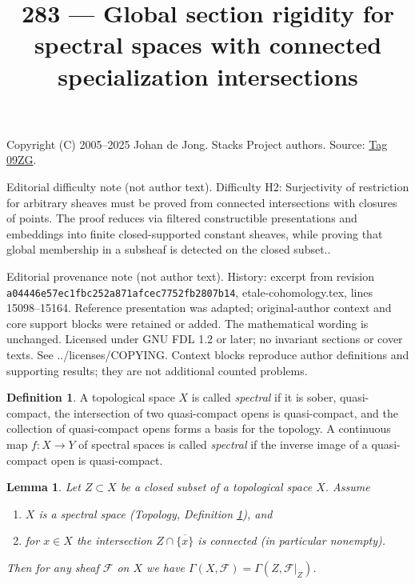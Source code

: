 \documentclass{amsart}
\theoremstyle{plain}
\newtheorem{lemma}[subsection]{Lemma}
\theoremstyle{definition}
\newtheorem{definition}[subsection]{Definition}
\theoremstyle{remark}
\numberwithin{equation}{subsection}
\begin{document}
\title[Stacks Project, Tag 09ZG]{283 --- Global section rigidity for spectral spaces with connected specialization intersections}
\maketitle
\noindent Copyright (C) 2005--2025 Johan de Jong. Stacks Project authors. Source: \href{https://stacks.math.columbia.edu/tag/09ZG}{Tag 09ZG}.

\noindent Editorial difficulty note (not author text). Difficulty H2: Surjectivity of restriction for arbitrary sheaves must be proved from connected intersections with closures of points. The proof reduces via filtered constructible presentations and embeddings into finite closed-supported constant sheaves, while proving that global membership in a subsheaf is detected on the closed subset..

\noindent Editorial provenance note (not author text). History: excerpt from revision \texttt{a0444\allowbreak 6e57e\allowbreak c1fbc\allowbreak 252a8\allowbreak 71afc\allowbreak ec775\allowbreak 2fb28\allowbreak 07b14}, etale-cohomology.tex, lines 15098--15164. Reference presentation was adapted; original-author context and core support blocks were retained or added. The mathematical wording is unchanged. Licensed under GNU FDL 1.2 or later; no invariant sections or cover texts. See ../licenses/COPYING. Context blocks reproduce author definitions and supporting results; they are not additional counted problems.

\begin{definition}
\label{topology-definition-spectral-space}
A topological space $X$ is called {\it spectral} if it is sober,
quasi-compact, the intersection of two quasi-compact opens is
quasi-compact, and the collection of quasi-compact opens forms a
basis for the topology. A continuous map $f : X \to Y$ of spectral
spaces is called {\it spectral} if the inverse image of a quasi-compact
open is quasi-compact.
\end{definition}

\begin{lemma}
\label{lemma-h0-topological}
Let $Z \subset X$ be a closed subset of a topological space $X$.
Assume
\begin{enumerate}
\item $X$ is a spectral space
(Topology, Definition \ref{topology-definition-spectral-space}), and
\item for $x \in X$ the intersection $Z \cap \overline{\{x\}}$
is connected (in particular nonempty).
\end{enumerate}
Then for any sheaf $\mathcal{F}$ on $X$ we have
$\Gamma(X, \mathcal{F}) = \Gamma(Z, \mathcal{F}|_Z)$.
\end{lemma}
\end{document}
